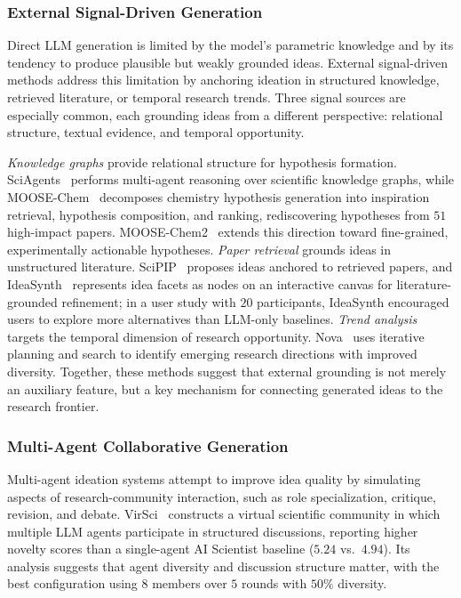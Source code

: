 \subsubsection{External Signal-Driven Generation}
\label{sec:idea_external}

Direct LLM generation is limited by the model's parametric knowledge and by its tendency to produce plausible but weakly grounded ideas. External signal-driven methods address this limitation by anchoring ideation in structured knowledge, retrieved literature, or temporal research trends. Three signal sources are especially common, each grounding ideas from a different perspective: relational structure, textual evidence, and temporal opportunity.

\emph{Knowledge graphs} provide relational structure for hypothesis formation. SciAgents~\cite{ghafarollahi2024sciagents} performs multi-agent reasoning over scientific knowledge graphs, while MOOSE-Chem~\cite{yang2024moosechem} decomposes chemistry hypothesis generation into inspiration retrieval, hypothesis composition, and ranking, rediscovering hypotheses from $51$ high-impact papers. MOOSE-Chem2~\cite{yang2025moosechem2} extends this direction toward fine-grained, experimentally actionable hypotheses. \emph{Paper retrieval} grounds ideas in unstructured literature. SciPIP~\cite{wang2024scipip} proposes ideas anchored to retrieved papers, and IdeaSynth~\cite{pu2025ideasynth} represents idea facets as nodes on an interactive canvas for literature-grounded refinement; in a user study with $20$ participants, IdeaSynth encouraged users to explore more alternatives than LLM-only baselines. \emph{Trend analysis} targets the temporal dimension of research opportunity. Nova~\cite{hu2024nova} uses iterative planning and search to identify emerging research directions with improved diversity. Together, these methods suggest that external grounding is not merely an auxiliary feature, but a key mechanism for connecting generated ideas to the research frontier.


\subsubsection{Multi-Agent Collaborative Generation}
\label{sec:idea_multiagent}

Multi-agent ideation systems attempt to improve idea quality by simulating aspects of research-community interaction, such as role specialization, critique, revision, and debate. VirSci~\cite{su2024virsci} constructs a virtual scientific community in which multiple LLM agents participate in structured discussions, reporting higher novelty scores than a single-agent AI Scientist baseline ($5.24$ vs.\ $4.94$). Its analysis suggests that agent diversity and discussion structure matter, with the best configuration using $8$ members over $5$ rounds with $50\%$ diversity.


